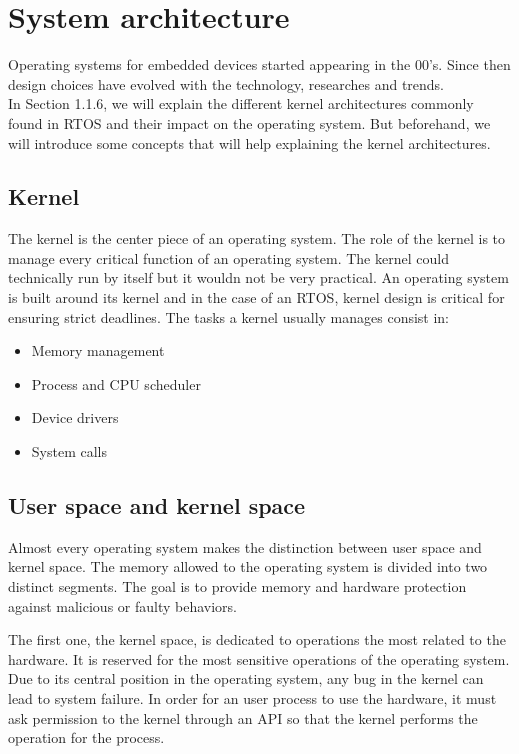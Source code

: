 \section{System architecture}

Operating systems for embedded devices started appearing in the 00's.
Since then design choices have evolved with the technology, researches and trends.
\\
In Section 1.1.6, we will explain the different kernel architectures commonly found in RTOS and their impact on the operating system.
But beforehand, we will introduce some concepts that will help explaining the kernel architectures.

\subsection{Kernel}
The kernel is the center piece of an operating system.
The role of the kernel is to manage every critical function of an operating system.
The kernel could technically run by itself but it wouldn not be very practical.
An operating system is built around its kernel and in the case of an RTOS, kernel design is critical for ensuring strict deadlines.
The tasks a kernel usually manages consist in:
\begin{itemize}
    \item Memory management
    \item Process and CPU scheduler
    \item Device drivers
    \item System calls
\end{itemize}

\subsection{User space and kernel space}
Almost every operating system makes the distinction between user space and kernel space.
The memory allowed to the operating system is divided into two distinct segments.
The goal is to provide memory and hardware protection against malicious or faulty behaviors.

The first one, the kernel space, is dedicated to operations the most related to the hardware.
It is reserved for the most sensitive operations of the operating system.
Due to its central position in the operating system, any bug in the kernel can lead to system failure.
In order for an user process to use the hardware, it must ask permission to the kernel through an API so that the kernel performs the operation for the process.

